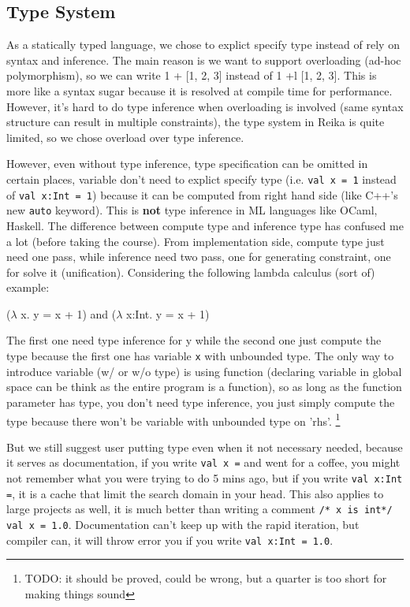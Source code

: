 \documentclass{article}
\begin{document}

\subsection{Type System}
\label{subsec:type-system}

As a statically typed language, we chose to explict specify type instead of rely on syntax and inference.
The main reason is we want to support overloading (ad-hoc polymorphism), so we can write 1 + [1, 2, 3] instead of 1 +l [1, 2, 3].
This is more like a syntax sugar because it is resolved at compile time for performance.
However, it's hard to do type inference when overloading is involved (same syntax structure can result in multiple constraints),
the type system in Reika is quite limited, so we chose overload over type inference.

However, even without type inference, type specification can be omitted in certain places,
variable don't need to explict specify type (i.e. \verb+val x = 1+ instead of \verb+val x:Int = 1+)
because it can be computed from right hand side (like C++'s new \verb+auto+ keyword).
This is \textbf{not} type inference in ML languages like OCaml, Haskell.
The difference between compute type and inference type has confused me a lot (before taking the course).
From implementation side, compute type just need one pass, while inference need two pass, one for generating constraint, one for solve it (unification).
Considering the following lambda calculus (sort of) example:

\begin{center}
    ($\lambda$ x. y = x + 1) and ($\lambda$ x:Int. y = x + 1)
\end{center}

The first one need type inference for y while the second one just compute the type
because the first one has variable \verb+x+ with unbounded type.
The only way to introduce variable (w/ or w/o type) is using function (declaring variable in global space can be think
as the entire program is a function), so as long as the function parameter has type, you don't need type inference, you just
simply compute the type because there won't be variable with unbounded type on 'rhs'.
\footnote{TODO: it should be proved, could be wrong, but a quarter is too short for making things sound}

But we still suggest user putting type even when it not necessary needed, because it serves as documentation,
if you write \verb+val x =+ and went for a coffee, you might not remember what you were trying to do 5 mins ago,
but if you write \verb+val x:Int =+, it is a cache that limit the search domain in your head.
This also applies to large projects as well, it is much better than writing a comment \verb+/* x is int*/ val x = 1.0+.
Documentation can't keep up with the rapid iteration, but compiler can, it will throw error you if you write \verb+val x:Int = 1.0+.
\end{document}
